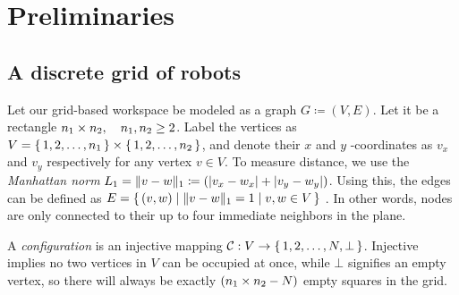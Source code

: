 \section{Preliminaries}
%
%
%




\subsection{A discrete grid of robots}
Let our grid-based workspace be modeled as a graph $G \coloneqq (V, E)$. 
Let it be a rectangle ${ n_1 \times n_2 }, \quad n_1, n_2 \geq 2$. 
Label the vertices as $V = \set{1, 2, \dots , n_1} \times \set{1, 2, \dots , n_2}$, and denote their $x$ and $y$ -coordinates as  $v_x$ and $v_y$ respectively for any vertex $v \in V$.
To measure distance, we use the \emph{Manhattan norm} $L_1 = \lVert v - w\rVert_1 \coloneqq (\lvert v_x - w_x\rvert + \lvert v_y - w_y\rvert)$.
Using this, the edges can be defined as $E = \set{(v, w) \mid \lVert v - w\rVert_1 = 1 \mid v, w \in V}$ .
In other words, nodes are only connected to their up to four immediate neighbors in the plane.

A \emph{configuration} is an injective mapping $\mathcal{C}_{} : V \rightarrow \set{1, 2, \dots, N, \bot}$. 
Injective implies no two vertices in $V$ can be occupied at once, while $\bot$ signifies an empty vertex, so there will always be exactly $({ n_1 \times n_2 } - N)$ empty squares in the grid. 

